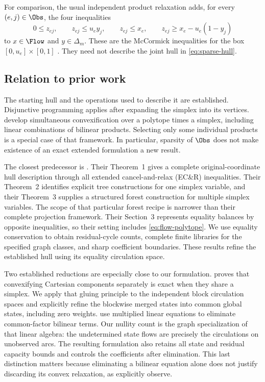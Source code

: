 For comparison, the usual independent product relaxation adds, for every
$(e,j)\in\Obs$, the four inequalities
\begin{equation}\label{eq:mccormick}
 0\le z_{ej},\qquad z_{ej}\le u_e y_j,\qquad
 z_{ej}\le x_e,\qquad
 z_{ej}\ge x_e-u_e(1-y_j)
\end{equation}
to $x\in\Flow$ and $y\in\Delta_m$. These are the McCormick inequalities
for the box $[0,u_e]\times[0,1]$ \citep{McCormick1976}. They need not describe
the joint hull in \eqref{eq:sparse-hull}.

\subsection{Relation to prior work}\label{subsec:prior-work}
The starting hull and the operations used to describe it are established.
Disjunctive programming \citep{Balas1998} applies after expanding the simplex
into its vertices. \citet{DavarniaRichardTawarmalani2017} develop simultaneous
convexification over a polytope times a simplex, including linear combinations
of bilinear products. Selecting only some individual products is a special
case of that framework. In particular, sparsity of $\Obs$ does not make
existence of an exact extended formulation a new result.

The closest predecessor is \citet{KhademniaDavarnia2025}. Their Theorem~1
gives a complete original-coordinate hull description through all extended
cancel-and-relax (EC\&R) inequalities. Their Theorem~2 identifies explicit
tree constructions for one simplex variable, and their Theorem~3 supplies a
structured forest construction for multiple simplex variables. The scope
of that particular forest recipe is narrower than their complete projection
framework. Their Section~3 represents equality balances by opposite
inequalities, so their setting includes \eqref{eq:flow-polytope}.
We use equality conservation to obtain residual-cycle counts, complete
finite libraries for the specified graph classes, and sharp coefficient
boundaries. These results refine the established hull using its equality circulation
space.

Two established reductions are especially close to our formulation.
\citet[Proposition~2.6]{Davarnia2016} proves that convexifying Cartesian
components separately is exact when they share a simplex. We apply that
gluing principle to the independent block circulation spaces and explicitly
refine the blockwise merged states into common global states, including
zero weights. \citet[Theorem~3.1]{LibertiPantelides2006} use multiplied linear
equations to eliminate common-factor bilinear terms. Our nullity count is
the graph specialization of that linear algebra: the undetermined state
flows are precisely the circulations on unobserved arcs. The resulting
formulation also retains all state and residual capacity bounds and controls
the coefficients after elimination. This last distinction matters because
eliminating a bilinear equation alone does not justify discarding its convex
relaxation, as \citet[discussion after Theorem~3.1]{LibertiPantelides2006}
explicitly observe.


